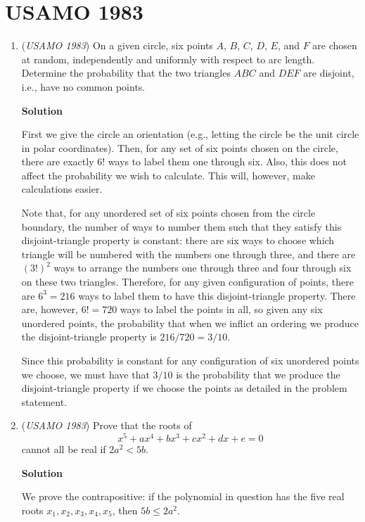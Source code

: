 \section{USAMO 1983}
        \begin{enumerate}
        	\item (\textit{USAMO 1983}) On a given circle, six points $A$, $B$, $C$, $D$, $E$, and $F$ are chosen at random, independently and uniformly with respect to arc length. Determine the probability that the two triangles $ABC$ and $DEF$ are disjoint, i.e., have no common points.


 



\textbf{Solution}

First we give the circle an orientation (e.g., letting the circle be the unit circle in polar coordinates).  Then, for any set of six points chosen on the circle, there are exactly $6!$ ways to label them one through six. Also, this does not affect the probability we wish to calculate. This will, however, make calculations easier.

 Note that, for any unordered set of six points chosen from the circle boundary, the number of ways to number them such that they satisfy this disjoint-triangle property is constant: there are six ways to choose which triangle will be numbered with the numbers one through three, and there are $(3!)^2$ ways to arrange the numbers one through three and four through six on these two triangles. Therefore, for any given configuration of points, there are $6^3=216$ ways to label them to have this disjoint-triangle property. There are, however, $6!=720$ ways to label the points in all, so given any six unordered points, the probability that when we inflict an ordering we produce the disjoint-triangle property is $216/720=3/10$.

 Since this probability is constant for any configuration of six unordered points we choose, we must have that $3/10$ is the probability that we produce the disjoint-triangle property if we choose the points as detailed in the problem statement.

 


	\item (\textit{USAMO 1983}) Prove that the roots of 
 \[x^5 + ax^4 + bx^3 + cx^2 + dx + e = 0\] cannot all be real if $2a^2 < 5b$.


 



\textbf{Solution}

We prove the contrapositive: if the polynomial in question has the five real roots $x_1, x_2, x_3, x_4, x_5$, then $5b \le 2a^2$.


\end{enumerate}
